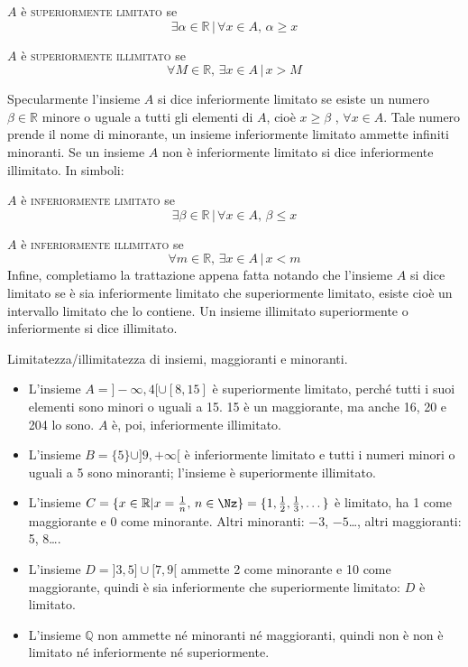 \(A\) è \textsc{superiormente limitato} se 
\begin{equation}
  \exists \alpha\in\mathbb{R}\, \vert\, \forall x \in A,\,\alpha\geq x
\end{equation}


\(A\) è \textsc{superiormente illimitato} se 
\begin{equation}
  \forall M\in\mathbb{R},\, \exists x \in A\, \vert\,x> M
\end{equation}

Specularmente l'insieme \(A\) si dice inferiormente limitato se esiste un 
numero \(\beta\in \mathbb{R}\) minore o uguale a tutti gli elementi di \(A\), 
cioè \(x\geq\beta\) , \(\forall x\in A\). Tale numero prende il nome di 
minorante, un insieme inferiormente limitato ammette infiniti minoranti. Se 
un insieme \(A\) non è inferiormente limitato si dice inferiormente 
illimitato.
In simboli:

\(A\) è \textsc{inferiormente limitato} se 
\begin{equation}
  \exists \beta\in\mathbb{R}\, \vert\, \forall x \in A,\,\beta\leq x
\end{equation}

\(A\) è \textsc{inferiormente illimitato} se 
\begin{equation}
  \forall m\in\mathbb{R},\, \exists x \in A\, \vert\,x< m
\end{equation}
Infine, completiamo la trattazione appena fatta notando che l'insieme \(A\) 
si dice limitato se è sia inferiormente limitato che superiormente limitato, 
esiste cioè un intervallo limitato che lo contiene. Un insieme illimitato 
superiormente o inferiormente si dice illimitato.

\begin{esempio} Limitatezza/illimitatezza di insiemi, maggioranti e 
minoranti.
\begin{itemize} [noitemsep]
  \item[a)] L'insieme \(A=]-\infty,4[ \cup [8,15]\) è superiormente 
limitato, perché tutti i suoi elementi sono minori o uguali a 15. 15 è un 
maggiorante, ma anche 16, 20 e 204 lo sono. \(A\) è, poi, inferiormente 
illimitato.
  \item[b)] L'insieme \(B=\{5\}\cup]9,+\infty[\) è inferiormente limitato 
e tutti i numeri minori o uguali a 5 sono minoranti; l'insieme è 
superiormente illimitato.
  \item[c)] L'insieme \(C=\{x\in\mathbb{R}\vert 
x=\frac{1}{n},\,n \in \Nz \}=\{1,\frac{1}{2},\frac{1}{3}
,\dots\}\) è limitato, ha 1 come maggiorante e 0 come minorante. 
Altri minoranti: \(-3\), \(-5\)\dots, altri maggioranti: 5, 8\dots.
  \item[d)] L'insieme \(D=]3,5]\cup[7,9[\) ammette 2 come minorante e 10 
come maggiorante, quindi è sia inferiormente che superiormente limitato: 
\(D\) è limitato.
  \item[e)] L'insieme \(\mathbb{Q}\) non ammette né minoranti né 
maggioranti, quindi non è non è limitato né inferiormente né superiormente.
\end{itemize}
\end{esempio}


